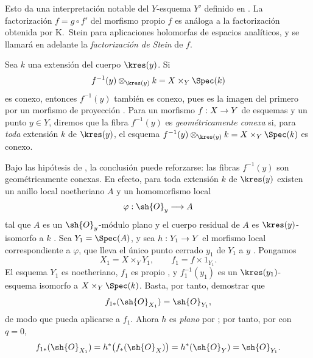 \documentclass[oneside]{amsart}
\makeatletter
\newcommand{\ega@arrow}[2]{\mathchoice{#1}{#2}{#2}{#2}}
\renewcommand{\to}{\ega@arrow{\longrightarrow}{\rightarrow}}
\newcommand{\oldpage}[2][]{{\marginnote{\normalfont\textbf{#1}~|~#2}}\ignorespaces}
\let\EGAOriginalLabel\label
\renewcommand{\label}[1]{\phantomsection\EGAOriginalLabel{#1}}
\makeatother
\begin{document}
Esto da una interpretación notable del $Y$-esquema $Y'$ definido en
. La factorización
$f=g\circ f'$ del morfismo propio $f$ es análoga a la factorización
obtenida por K.~Stein para aplicaciones holomorfas de espacios
analíticos, y se llamará en adelante la \emph{factorización de Stein}
de $f$.

\begin{remark}[4.3.4]
\label{III.4.3.4}
Sea $k$ una extensión del cuerpo $\kres(y)$. Si
\[
  f^{-1}(y)\otimes_{\kres(y)}k
  =
  X\times_Y\Spec(k)
\]
es conexo, entonces $f^{-1}(y)$ también es conexo, pues es la imagen
del primero por un morfismo de proyección
. Para un morfismo $f:X\to Y$ de esquemas y un punto
$y\in Y$, diremos que la fibra $f^{-1}(y)$ es
\emph{geométricamente conexa} si, para \emph{toda} extensión $k$ de
$\kres(y)$, el esquema
$f^{-1}(y)\otimes_{\kres(y)}k=X\times_Y\Spec(k)$ es conexo.

\oldpage[III]{132}

Bajo las hipótesis de , la conclusión puede
reforzarse: las fibras $f^{-1}(y)$ son geométricamente conexas.
En efecto, para toda extensión $k$ de $\kres(y)$ existen un anillo
local noetheriano $A$ y un homomorfismo local
\[
  \varphi:\sh{O}_y\longrightarrow A
\]
tal que $A$ es un $\sh{O}_y$-módulo plano y el cuerpo residual de
$A$ es $\kres(y)$-isomorfo a $k$ .
Sea $Y_1=\Spec(A)$, y sea $h:Y_1\to Y$ el morfismo local
correspondiente a $\varphi$, que lleva el único punto cerrado $y_1$ de
$Y_1$ a $y$ . Pongamos
\[
  X_1=X\times_Y Y_1,
  \qquad
  f_1=f\times 1_{Y_1}.
\]
El esquema $Y_1$ es noetheriano, $f_1$ es propio
, y $f_1^{-1}(y_1)$ es un
$\kres(y_1)$-esquema isomorfo a $X\times_Y\Spec(k)$. Basta, por
tanto, demostrar que
\[
  f_{1*}(\sh{O}_{X_1})=\sh{O}_{Y_1},
\]
de modo que  pueda aplicarse a $f_1$. Ahora $h$ es
\emph{plano} por ; por tanto, por  con
$q=0$,
\[
  f_{1*}(\sh{O}_{X_1})
  =
  h^*\bigl(f_*(\sh{O}_X)\bigr)
  =
  h^*(\sh{O}_Y)
  =
  \sh{O}_{Y_1}.
\]


\end{remark}
\end{document}
